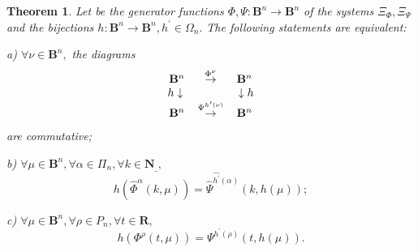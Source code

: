 \documentclass[12pt]{article}\usepackage{amsmath}
\newtheorem{theorem}{Theorem}
\begin{document}
\begin{theorem}
\label{The60}Let be the generator functions $\Phi,\Psi:\mathbf{B}^{n}\rightarrow\mathbf{B}^{n}$ of the systems $\Xi_{\Phi},\Xi_{\Psi}$ and the
bijections $h:\mathbf{B}^{n}\rightarrow\mathbf{B}^{n},h^{\prime}\in\Omega
_{n}.$ The following statements are equivalent:

a) $\forall\nu\in\mathbf{B}^{n},$ the diagrams\[\begin{array}
[c]{ccc}\mathbf{B}^{n} & \overset{\Phi^{\nu}}{\rightarrow} & \mathbf{B}^{n}\\
h\downarrow\; &  & \;\downarrow h\\
\mathbf{B}^{n} & \overset{\Psi^{h^{\prime}(\nu)}}{\rightarrow} &
\mathbf{B}^{n}\end{array}
\]
are commutative;

b) $\forall\mu\in\mathbf{B}^{n},\forall\alpha\in\Pi_{n},\forall k\in
\mathbf{N}_{\_},$\[
h(\widehat{\Phi}^{\alpha}(k,\mu))=\widehat{\Psi}^{\widehat{h^{\prime}}(\alpha)}(k,h(\mu));
\]


c) $\forall\mu\in\mathbf{B}^{n},\forall\rho\in P_{n},\forall t\in\mathbf{R},$\begin{equation}
h(\Phi^{\rho}(t,\mu))=\Psi^{h^{\prime}(\rho)}(t,h(\mu)). \label{eds1}\end{equation}

\end{theorem}
\end{document}
